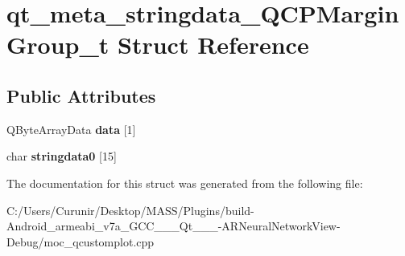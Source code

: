 \hypertarget{structqt__meta__stringdata___q_c_p_margin_group__t}{}\section{qt\+\_\+meta\+\_\+stringdata\+\_\+\+Q\+C\+P\+Margin\+Group\+\_\+t Struct Reference}
\label{structqt__meta__stringdata___q_c_p_margin_group__t}
\subsection*{Public Attributes}
\begin{DoxyCompactItemize}
\item 
\mbox{\label{structqt__meta__stringdata___q_c_p_margin_group__t_ae6578dc3f853958897e6dd0400c2bce9}} 
Q\+Byte\+Array\+Data {\bfseries data} \mbox{[}1\mbox{]}
\item 
\mbox{\label{structqt__meta__stringdata___q_c_p_margin_group__t_a1f271025f26a30414a67f814d30d3d55}} 
char {\bfseries stringdata0} \mbox{[}15\mbox{]}
\end{DoxyCompactItemize}


The documentation for this struct was generated from the following file\+:\begin{DoxyCompactItemize}
\item 
C\+:/\+Users/\+Curunir/\+Desktop/\+M\+A\+S\+S/\+Plugins/build-\/\+Android\+\_\+armeabi\+\_\+v7a\+\_\+\+G\+C\+C\+\_\+\_\+\_\+\+Qt\+\_\+\_\+\_-\/\+A\+R\+Neural\+Network\+View-\/\+Debug/moc\+\_\+qcustomplot.\+cpp\end{DoxyCompactItemize}
